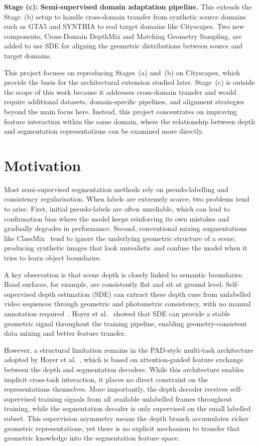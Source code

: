 \textbf{Stage (c): Semi-supervised domain adaptation pipeline.}
This extends the Stage~(b) setup to handle cross-domain transfer from
synthetic source domains such as GTA5 and SYNTHIA to real target domains
like Cityscapes. Two new components, Cross-Domain DepthMix and Matching
Geometry Sampling, are added to use SDE for aligning the geometric
distributions between source and target domains.

This project focuses on reproducing Stages~(a) and~(b) on Cityscapes,
which provide the basis for the architectural extension studied later.
Stage~(c) is outside the scope of this work because it addresses
cross-domain transfer and would require additional datasets,
domain-specific pipelines, and alignment strategies beyond the main focus
here. Instead, this project concentrates on improving feature interaction
within the same domain, where the relationship between depth and
segmentation representations can be examined more directly.

\section{Motivation}

Most semi-supervised segmentation methods rely on pseudo-labelling and
consistency regularisation. When labels are extremely scarce, two problems
tend to arise. First, initial pseudo-labels are often unreliable, which can
lead to confirmation bias where the model keeps reinforcing its own mistakes
and gradually degrades in performance. Second, conventional mixing
augmentations like ClassMix~\cite{olsson2021classmix} tend to ignore the
underlying geometric structure of a scene, producing synthetic images that
look unrealistic and confuse the model when it tries to learn object
boundaries.

A key observation is that scene depth is closely linked to semantic
boundaries. Road surfaces, for example, are consistently flat and sit at
ground level. Self-supervised depth estimation (SDE) can extract these depth
cues from unlabelled video sequences through geometric and photometric
consistency, with no manual annotation required~\cite{godard2017unsupervised}.
Hoyer et al.~\cite{hoyer2023improving} showed that SDE can provide a stable
geometric signal throughout the training pipeline, enabling
geometry-consistent data mixing and better feature transfer.

However, a structural limitation remains in the PAD-style multi-task
architecture adopted by Hoyer et al.~\cite{hoyer2023improving}, which is
based on attention-guided feature exchange between the depth and
segmentation decoders. While this architecture enables implicit cross-task
interaction, it places no direct constraint on the representations
themselves. More importantly, the depth decoder receives self-supervised
training signals from all available unlabelled frames throughout training,
while the segmentation decoder is only supervised on the small labelled
subset. This supervision asymmetry means the depth branch accumulates
richer geometric representations, yet there is no explicit mechanism to
transfer that geometric knowledge into the segmentation feature space.

